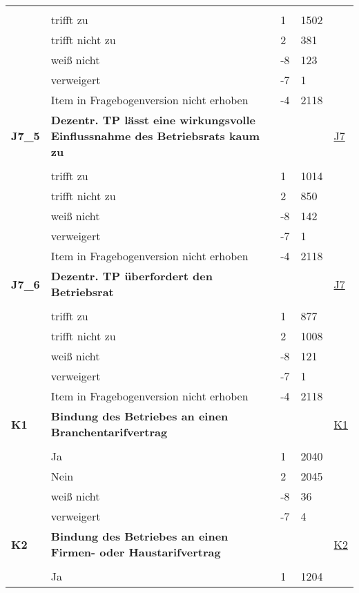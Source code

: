 \begin{longtable}{| L{2.5cm} | L{8.25cm}| C{1.5cm} | R{1.25cm} | C{2.25cm} |  }
   &  &  &  &  \\ 
   & trifft zu & 1 & 1502 &  \\ 
   & trifft nicht zu & 2 & 381 &  \\ 
   & weiß nicht & -8 & 123 &  \\ 
   & verweigert & -7 & 1 &  \\ 
   & Item in Fragebogenversion nicht erhoben & -4 & 2118 &  \\ 
   \midrule
\textbf{J7\_5}\label{var:suf:J7:5} & \textbf{Dezentr. TP lässt eine wirkungsvolle Einflussnahme des Betriebsrats kaum zu} &  &  & \hyperref[J7]{J7} \\ 
   &  &  &  &  \\ 
   & trifft zu & 1 & 1014 &  \\ 
   & trifft nicht zu & 2 & 850 &  \\ 
   & weiß nicht & -8 & 142 &  \\ 
   & verweigert & -7 & 1 &  \\ 
   & Item in Fragebogenversion nicht erhoben & -4 & 2118 &  \\ 
   \midrule
\textbf{J7\_6}\label{var:suf:J7:6} & \textbf{Dezentr. TP überfordert den Betriebsrat} &  &  & \hyperref[J7]{J7} \\ 
   &  &  &  &  \\ 
   & trifft zu & 1 & 877 &  \\ 
   & trifft nicht zu & 2 & 1008 &  \\ 
   & weiß nicht & -8 & 121 &  \\ 
   & verweigert & -7 & 1 &  \\ 
   & Item in Fragebogenversion nicht erhoben & -4 & 2118 &  \\ 
   \midrule
\textbf{K1}\label{var:suf:K1} & \textbf{Bindung des Betriebes an einen Branchentarifvertrag} &  &  & \hyperref[K1]{K1} \\ 
   &  &  &  &  \\ 
   & Ja & 1 & 2040 &  \\ 
   & Nein & 2 & 2045 &  \\ 
   & weiß nicht & -8 & 36 &  \\ 
   & verweigert & -7 & 4 &  \\ 
   \midrule
\textbf{K2}\label{var:suf:K2} & \textbf{Bindung des Betriebes an einen Firmen- oder Haustarifvertrag} &  &  & \hyperref[K2]{K2} \\ 
   &  &  &  &  \\ 
   & Ja & 1 & 1204 &  \\ 

\end{longtable}
